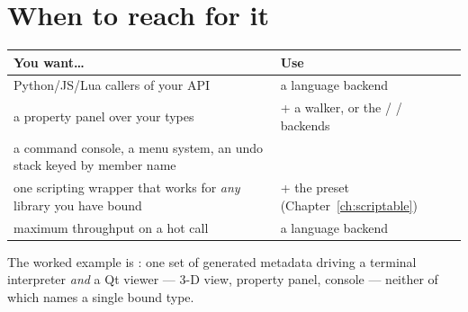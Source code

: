 \section{When to reach for it}

\begin{center}
\small
\begin{tabular}{@{}L{6.4cm}L{7.0cm}@{}}
\toprule
\textbf{You want\ldots} & \textbf{Use} \\
\midrule
Python/JS/Lua callers of your API & a language backend \\
a property panel over your types &  + a walker, or the
   /  /  backends \\
a command console, a menu system, an undo stack keyed by member name &
   \\
one scripting wrapper that works for \emph{any} library you have bound &
   + the  preset (Chapter~\ref{ch:scriptable}) \\
maximum throughput on a hot call & a language backend \\
\bottomrule
\end{tabular}
\end{center}

The worked example is : one set of generated metadata
driving a terminal interpreter \emph{and} a Qt viewer --- 3-D view, property
panel, console --- neither of which names a single bound type.
